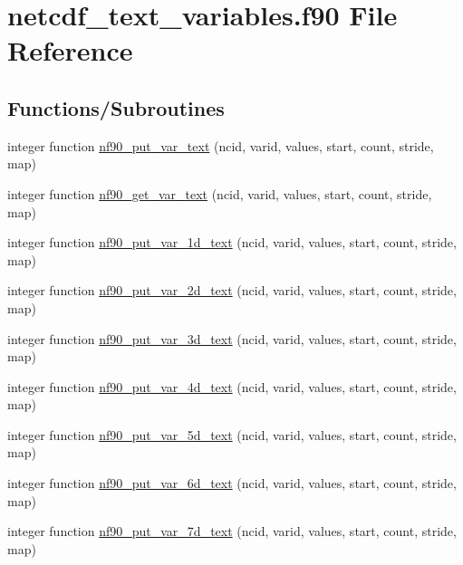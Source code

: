 \hypertarget{netcdf__text__variables_8f90}{}\section{netcdf\+\_\+text\+\_\+variables.\+f90 File Reference}
\label{netcdf__text__variables_8f90}
\subsection*{Functions/\+Subroutines}
\begin{DoxyCompactItemize}
\item 
integer function \hyperlink{netcdf__text__variables_8f90_a3c866ab5a35489ce0d9797838aec5b2c}{nf90\+\_\+put\+\_\+var\+\_\+text} (ncid, varid, values, start, count, stride, map)
\item 
integer function \hyperlink{netcdf__text__variables_8f90_acc3d60da31f80b17d7fd5e06d4290a43}{nf90\+\_\+get\+\_\+var\+\_\+text} (ncid, varid, values, start, count, stride, map)
\item 
integer function \hyperlink{netcdf__text__variables_8f90_ad41d9ea76e7347555a238de5afd425e8}{nf90\+\_\+put\+\_\+var\+\_\+1d\+\_\+text} (ncid, varid, values, start, count, stride, map)
\item 
integer function \hyperlink{netcdf__text__variables_8f90_abeb77c7100cff6d00ee5eb0912a8696c}{nf90\+\_\+put\+\_\+var\+\_\+2d\+\_\+text} (ncid, varid, values, start, count, stride, map)
\item 
integer function \hyperlink{netcdf__text__variables_8f90_a6b41034b62da58c313e15328cb551488}{nf90\+\_\+put\+\_\+var\+\_\+3d\+\_\+text} (ncid, varid, values, start, count, stride, map)
\item 
integer function \hyperlink{netcdf__text__variables_8f90_a61fb43bb62849e0fa471b9c6dbe45f4f}{nf90\+\_\+put\+\_\+var\+\_\+4d\+\_\+text} (ncid, varid, values, start, count, stride, map)
\item 
integer function \hyperlink{netcdf__text__variables_8f90_a229342530494b303bb44f2f5f8fb85c8}{nf90\+\_\+put\+\_\+var\+\_\+5d\+\_\+text} (ncid, varid, values, start, count, stride, map)
\item 
integer function \hyperlink{netcdf__text__variables_8f90_a563af472ff0a6b2ead693e554c761029}{nf90\+\_\+put\+\_\+var\+\_\+6d\+\_\+text} (ncid, varid, values, start, count, stride, map)
\item 
integer function \hyperlink{netcdf__text__variables_8f90_a0cb3056fbb252e562bc9601f86162b93}{nf90\+\_\+put\+\_\+var\+\_\+7d\+\_\+text} (ncid, varid, values, start, count, stride, map)

\end{DoxyCompactItemize}
